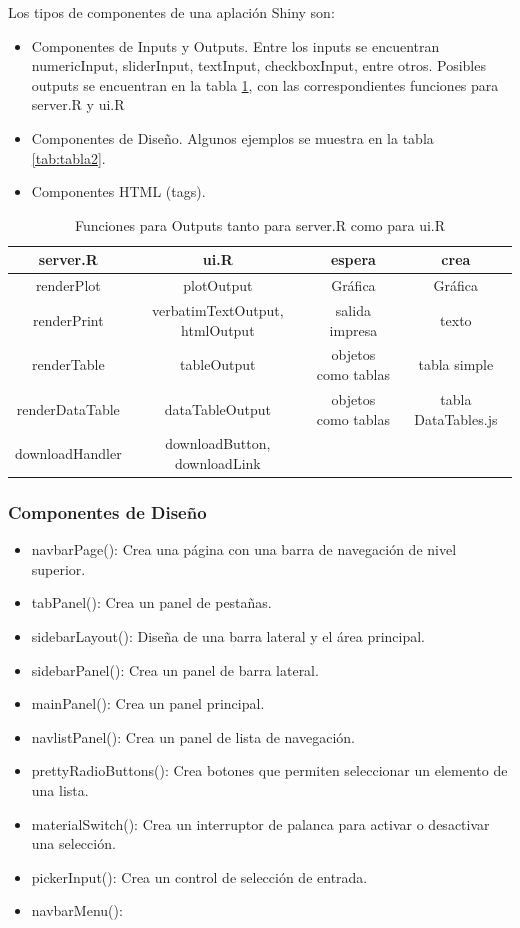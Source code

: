 Los tipos de componentes de una aplación Shiny son:
\begin{itemize}
\item Componentes de Inputs y Outputs. Entre los inputs se encuentran numericInput, sliderInput, textInput, checkboxInput, entre otros. Posibles outputs se encuentran en la tabla \ref{tab:tabla1}, con las correspondientes funciones para server.R y ui.R
\item Componentes de Diseño. Algunos ejemplos se muestra en la tabla \ref{tab:tabla2}.
\item Componentes HTML (tags).
\end{itemize}


\begin{table}[h]
\begin{center}
\caption{Funciones para Outputs tanto para server.R como para ui.R}
\label{tab:tabla1}
\resizebox{\textwidth}{!} {
\begin{tabular}{cccc}
\hline
server.R & ui.R & espera & crea \\
\hline 
renderPlot & plotOutput & Gráfica & Gráfica\\
renderPrint & verbatimTextOutput, htmlOutput& salida impresa & texto\\
renderTable & tableOutput & objetos como tablas & tabla simple\\
renderDataTable & dataTableOutput & objetos como tablas & tabla DataTables.js\\
downloadHandler	& downloadButton, downloadLink & &\\
\hline 
\end{tabular}
}
\end{center}
\end{table}

\subsubsection{Componentes de Diseño}
\begin{itemize}
\item navbarPage(): Crea una página con una barra de navegación de nivel superior.
\item tabPanel(): Crea un panel de pestañas.
\item sidebarLayout(): Diseña de una barra lateral y el área principal.
\item sidebarPanel(): Crea un panel de barra lateral.
\item mainPanel(): Crea un panel principal.
\item navlistPanel(): Crea un panel de lista de navegación.
\item prettyRadioButtons(): Crea botones que permiten seleccionar un elemento de una lista.
\item materialSwitch(): Crea un interruptor de palanca para activar o desactivar una selección.
\item pickerInput(): Crea un control de selección de entrada.
\item navbarMenu():
\end{itemize}

